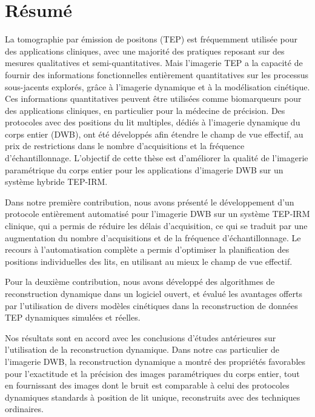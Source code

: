 \section*{Résumé}
La tomographie par émission de positons (TEP) est fréquemment utilisée pour des applications cliniques, avec une majorité des pratiques reposant sur des mesures qualitatives et semi-quantitatives. Mais l'imagerie TEP a la capacité de fournir des informations fonctionnelles entièrement quantitatives sur les processus sous-jacents explorés, grâce à l'imagerie dynamique et à la modélisation cinétique. Ces informations quantitatives peuvent être utilisées comme biomarqueurs pour des applications cliniques, en particulier pour la médecine de précision. Des protocoles avec des positions du lit multiples, dédiés à l'imagerie dynamique du corps entier (DWB), ont été développés afin étendre le champ de vue effectif, au prix de restrictions dans le nombre d'acquisitions et la fréquence d'échantillonnage. L'objectif de cette thèse est d'améliorer la qualité de l'imagerie paramétrique du corps entier pour les applications d'imagerie DWB sur un système hybride TEP-IRM.

Dans notre première contribution, nous avons présenté le développement d'un protocole entièrement automatisé pour l'imagerie DWB sur un système TEP-IRM clinique, qui a permis de réduire les délais d'acquisition, ce qui se traduit par une augmentation du nombre d'acquisitions et de la fréquence d'échantillonnage. Le recours à l'automatisation complète a permis d'optimiser la planification des positions individuelles des lits, en utilisant au mieux le champ de vue effectif. 

Pour la deuxième contribution, nous avons développé des algorithmes de reconstruction dynamique dans un logiciel ouvert, et évalué les avantages offerts par l'utilisation de divers modèles cinétiques dans la reconstruction de données TEP dynamiques simulées et réelles. 

Nos résultats sont en accord avec les conclusions d’études antérieures sur l'utilisation de la reconstruction dynamique. Dans notre cas particulier de l'imagerie DWB, la reconstruction dynamique a montré des propriétés favorables pour l'exactitude et la précision des images paramétriques du corps entier, tout en fournissant des images dont le bruit est comparable à celui des protocoles dynamiques standards à position de lit unique, reconstruits avec des techniques ordinaires.


